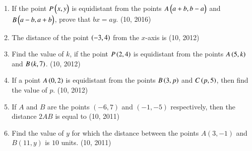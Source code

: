 \begin{enumerate}[label=\thesubsection.\arabic*, ref=\thesubsection.\theenumi]
    \item If the point $P \begin{pmatrix}x, y\end{pmatrix}$ is equidistant from the points $A \begin{pmatrix}a+b, b-a\end{pmatrix}$ and $B \begin{pmatrix}a-b, a+b\end{pmatrix}$, prove that $bx = ay$. \hfill (10, 2016)
\item The distance of the point $\left(-3,4\right)$ from the $x$-axis is
\hfill (10, 2012)
\item Find the value of $k$, if the point $P\left(2,4\right)$ is equidistant from the points $A\left(5,k\right)$ and $B\left(k,7\right)$. 
\hfill (10, 2012)
\item If a point $A\left(0,2\right)$ is equidistant from the points $B\left(3,p\right)$ and $C\left(p,5\right)$, then find the value of $p$. 
\hfill (10, 2012)
\item If $A$ and $B$ are the points $(-6, 7)$ and $(-1, -5)$ respectively, then the distance $2AB$ is equal to
\hfill (10, 2011)
\item Find the value of $y$ for which the distance between the points $A(3, -1)$ and $B(11, y)$ is $10$ units.
\hfill (10, 2011)
\end{enumerate}
